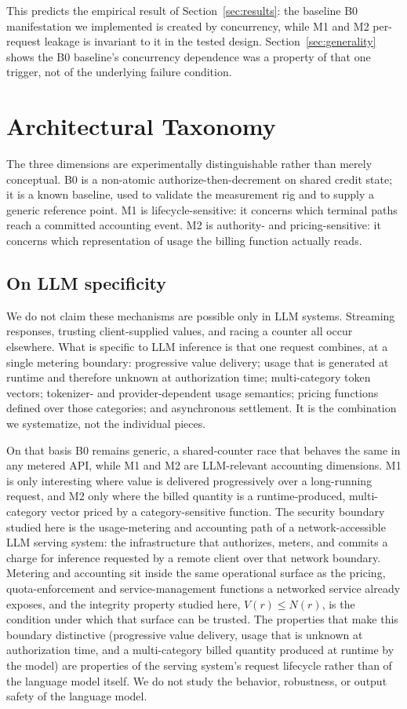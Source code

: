 \documentclass[preprint,3p,authoryear,12pt]{elsarticle}
\begin{document}
This predicts the empirical result of Section~\ref{sec:results}: the baseline B0
manifestation we implemented is created by concurrency, while M1 and M2 per-request
leakage is invariant to it in the tested design. Section~\ref{sec:generality}
shows the B0 baseline's concurrency dependence was a property of that one trigger, not
of the underlying failure condition.

\section{Architectural Taxonomy}
\label{sec:taxonomy}
The three dimensions are experimentally distinguishable rather than merely conceptual. B0
is a non-atomic authorize-then-decrement on shared credit state; it is a known baseline,
used to validate the measurement rig and to supply a generic reference point. M1 is
lifecycle-sensitive: it concerns which terminal paths reach a committed accounting event.
M2 is authority- and pricing-sensitive: it concerns which representation of usage the
billing function actually reads.

\subsection{On LLM specificity}
We do not claim these mechanisms are possible only in LLM systems. Streaming responses,
trusting client-supplied values, and racing a counter all occur elsewhere. What is
specific to LLM inference is that one request combines, at a single metering boundary:
progressive value delivery; usage that is generated at runtime and therefore unknown at
authorization time; multi-category token vectors; tokenizer- and provider-dependent usage
semantics; pricing functions defined over those categories; and asynchronous settlement.
It is the combination we systematize, not the individual pieces.

On that basis B0 remains generic, a shared-counter race that behaves the same in any
metered API, while M1 and M2 are LLM-relevant accounting dimensions. M1 is only
interesting where value is delivered progressively over a long-running request, and M2
only where the billed quantity is a runtime-produced, multi-category vector priced by a
category-sensitive function. The security boundary studied here is the usage-metering and
accounting path of a network-accessible LLM serving system: the infrastructure that
authorizes, meters, and commits a charge for inference requested by a remote client over
that network boundary. Metering and accounting sit inside the same operational surface as
the pricing, quota-enforcement and service-management functions a networked service
already exposes, and the integrity property studied here, $V(r) \le N(r)$, is the
condition under which that surface can be trusted. The properties that make this
boundary distinctive (progressive value delivery, usage that is unknown at
authorization time, and a multi-category billed quantity produced at runtime by the
model) are properties of the serving system's request lifecycle rather than of the
language model itself. We do not study the behavior, robustness, or output safety of the
language model.
\end{document}
